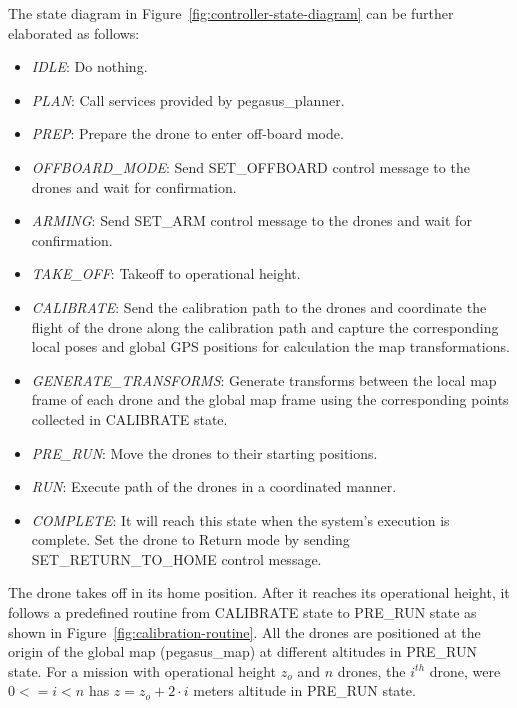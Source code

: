 The state diagram in Figure~\ref{fig:controller-state-diagram} can be further elaborated as follows:
\begin{itemize}
	\item \textit{IDLE}: Do nothing.
	\item \textit{PLAN}: Call services provided by pegasus\_planner. 
	\item \textit{PREP}: Prepare the drone to enter off-board mode.
	\item \textit{OFFBOARD\_MODE}: Send SET\_OFFBOARD control message to the drones and wait for confirmation.
	\item \textit{ARMING}: Send SET\_ARM control message to the drones and wait for confirmation.
	\item \textit{TAKE\_OFF}: Takeoff to operational height.
	\item \textit{CALIBRATE}: Send the calibration path to the drones and coordinate the flight of the drone along the calibration path and capture the corresponding local poses and global GPS positions for calculation the map transformations.
	\item \textit{GENERATE\_TRANSFORMS}: Generate transforms between the local map frame of each drone and the global map frame using the corresponding points collected in CALIBRATE state.
	\item \textit{PRE\_RUN}: Move the drones to their starting positions.
	\item \textit{RUN}: Execute path of the drones in a coordinated manner.
	\item \textit{COMPLETE}: It will reach this state when the system's execution is complete. Set the drone to Return mode by sending SET\_RETURN\_TO\_HOME control message.
\end{itemize}

The drone takes off in its home position. After it reaches its operational height, it follows a predefined routine from CALIBRATE state to PRE\_RUN state as shown in Figure~\ref{fig:calibration-routine}.  All the drones are positioned at the origin of the global map (pegasus\_map) at different altitudes in PRE\_RUN state. For a mission with operational height $z_o$ and $n$ drones, the $i^{th}$ drone, were $0 <= i < n$ has $z = z_o + 2\cdot i$ meters altitude in PRE\_RUN state. 

